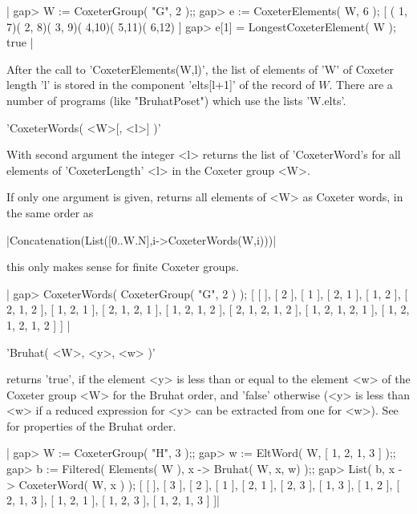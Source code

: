 |    gap> W := CoxeterGroup( "G", 2 );;
    gap> e := CoxeterElements( W, 6 );
    [ ( 1, 7)( 2, 8)( 3, 9)( 4,10)( 5,11)( 6,12) ]
    gap> e[1] = LongestCoxeterElement( W );
    true |

After  the call to  'CoxeterElements(W,l)', the list  of elements of 'W' of
Coxeter  length 'l' is stored in the component 'elts[l+1]' of the record of
$W$.  There are  a number  of programs  (like "BruhatPoset")  which use the
lists 'W.elts'.


'CoxeterWords( <W>[, <l>] )'

With second argument the integer <l> returns the list of 'CoxeterWord's for
all elements of 'CoxeterLength' <l> in the Coxeter group <W>.

If  only one  argument is  given, returns  all elements  of <W>  as Coxeter
words, in the same order as

|Concatenation(List([0..W.N],i->CoxeterWords(W,i)))|

this only makes sense for finite Coxeter groups.

|    gap> CoxeterWords( CoxeterGroup( "G", 2 ) );
    [ [  ], [ 2 ], [ 1 ], [ 2, 1 ], [ 1, 2 ], [ 2, 1, 2 ], [ 1, 2, 1 ],
      [ 2, 1, 2, 1 ], [ 1, 2, 1, 2 ], [ 2, 1, 2, 1, 2 ],
      [ 1, 2, 1, 2, 1 ], [ 1, 2, 1, 2, 1, 2 ] ] |


'Bruhat( <W>, <y>, <w> )'

returns 'true', if the element <y> is less than or equal to the element <w>
of  the Coxeter group <W> for the  Bruhat order, and 'false' otherwise (<y>
is  less than <w> if a reduced expression for <y> can be extracted from one
for  <w>). See \cite[(5.9) and (5.10)]{Hum90}  for properties of the Bruhat
order.

|    gap> W := CoxeterGroup( "H", 3 );;
    gap> w := EltWord( W, [ 1, 2, 1, 3 ] );;
    gap> b := Filtered( Elements( W ), x -> Bruhat( W, x, w) );;
    gap> List( b, x -> CoxeterWord( W, x ) );
    [ [  ], [ 3 ], [ 2 ], [ 1 ], [ 2, 1 ], [ 2, 3 ], [ 1, 3 ], [ 1, 2 ],
      [ 2, 1, 3 ], [ 1, 2, 1 ], [ 1, 2, 3 ], [ 1, 2, 1, 3 ] ]|


